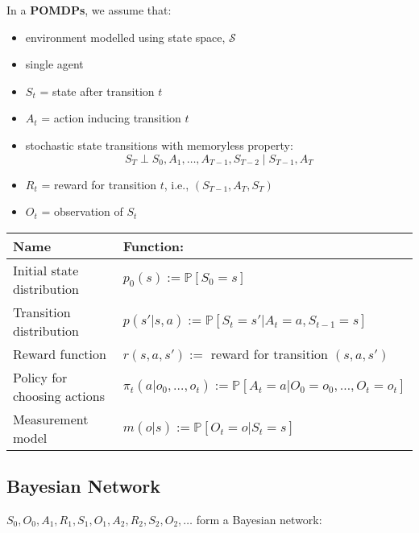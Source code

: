 \begin{summary}
    In a \textbf{POMDPs}, we assume that: 
    \begin{itemize}
        \item environment modelled using state space, $\mathcal{S}$
        \item single agent
        \item $S_t$ = state after transition $t$
        \item $A_t$ = action inducing transition $t$
        \item stochastic state transitions with memoryless property:
        \[
        S_T \perp S_0, A_1, \dots, A_{T-1}, S_{T-2} \mid S_{T-1}, A_T
        \]
        \item $R_t$ = reward for transition $t$, i.e., $(S_{T-1}, A_T, S_T)$
        \item $O_t$ = observation of $S_t$
    \end{itemize}
    \vspace{1em}

    \begin{center}
        \begin{tabular}{ll}
            \toprule
            \textbf{Name} & \textbf{Function:} \\
            \midrule
            Initial state distribution & $p_0(s) := \mathbb{P}[S_0 = s]$ \\
            \midrule
            Transition distribution & $p(s'|s,a) := \mathbb{P}[S_t = s' | A_t = a, S_{t-1} = s]$ \\
            \midrule
            Reward function & $r(s,a,s') :=$ reward for transition $(s, a, s')$ \\
            \midrule
            Policy for choosing actions & $\pi_t(a | o_0, \dots, o_t) := \mathbb{P}[A_t = a | O_0 = o_0, \dots, O_t = o_t]$ \\
            \midrule
            Measurement model & $m(o | s) := \mathbb{P}[O_t = o | S_t = s]$ \\
            \bottomrule
        \end{tabular}
    \end{center}
\end{summary}
\newpage

\subsection{Bayesian Network}
\begin{notes}
    $S_0, O_0, A_1, R_1, S_1, O_1, A_2, R_2, S_2, O_2, \dots$ form a Bayesian network:
\end{notes}

\begin{example}
    
\end{example}